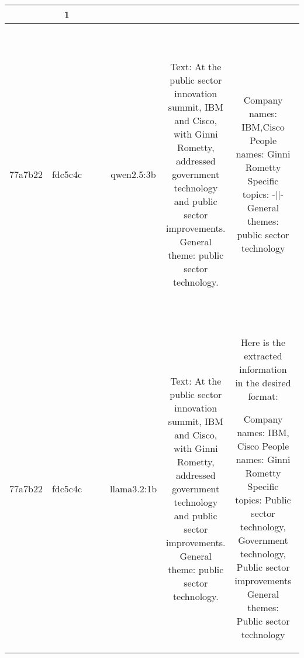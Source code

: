 \begin{table}[h!]
\begin{tabular}{|c|c|c|c|c|c|c|c|c|c|}
{ERR & 1\\
\hline
77a7b22 & fdc5c4c &  &  & qwen2.5:3b & Text: At the public sector innovation summit, IBM and Cisco, with Ginni Rometty, addressed government technology and public sector improvements. General theme: public sector technology. & Company names: IBM,Cisco
People names: Ginni Rometty
Specific topics: -||-
General themes: public sector technology & err & The chatbot output provides results in the specified format, with sections for company names, people names, specific topics, and general themes. However, there is a clear violation in the output for the "Specific topics" section. The description requires extracting specific topics fitting the content and providing them in the format "Specific topics: <comma_separated_list_of_specific_topics>", not using the "-||-" placeholder. This format appears to act as a placeholder for 'none' or similar, which is not part of the described format in the task; it should always be an explicit list as indicated—even if empty, which it isn't specified it can be. Similarly, the company names and people names sections should have hyphens between the placeholders if they intended 'none' such as "-||-", but this is not clearly indicated in the execution.

ERR & 1\\
\hline
77a7b22 & fdc5c4c &  &  & llama3.2:1b & Text: At the public sector innovation summit, IBM and Cisco, with Ginni Rometty, addressed government technology and public sector improvements. General theme: public sector technology. & Here is the extracted information in the desired format:

Company names: IBM, Cisco
People names: Ginni Rometty
Specific topics: Public sector technology, Government technology, Public sector improvements
General themes: Public sector technology & ok & The evaluation process involves checking whether the chatbot's output follows the prescribed format and structure outlined in the given description. Here's the step-by-step analysis:

1. **Company names**: The output lists "IBM, Cisco" under "Company names." This matches the expected format `<comma_separated_list_of_company_names>` as described. Therefore, it is compliant.

2. **People names**: The output includes "Ginni Rometty" under "People names." This matches the expected format `<comma_separated_list_of_people_names>` as described. Hence, it is compliant.

3. **Specific topics**: The output lists "Public sector technology, Government technology, Public sector improvements" under "Specific topics." This also matches the expected format `<comma_separated_list_of_specific_topics>` as described, thus compliant.

}
\end{tabular}
\end{table}
